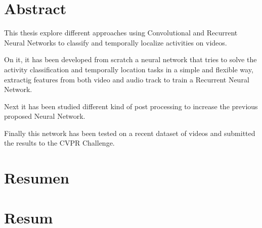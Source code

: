 \chapter*{Abstract}

This thesis explore different approaches using Convolutional and Recurrent Neural Networks to classify and temporally localize activities on videos.

On it, it has been developed from scratch a neural network that tries to solve the activity classification and temporally location tasks in a simple and flexible way, extractig features from both video and audio track to train a Recurrent Neural Network.

Next it has been studied different kind of post processing to increase the previous proposed Neural Network.

Finally this network has been tested on a recent dataset of videos and submitted the results to the CVPR Challenge.

\chapter*{Resumen}

\blindtext


\chapter*{Resum}

\blindtext
